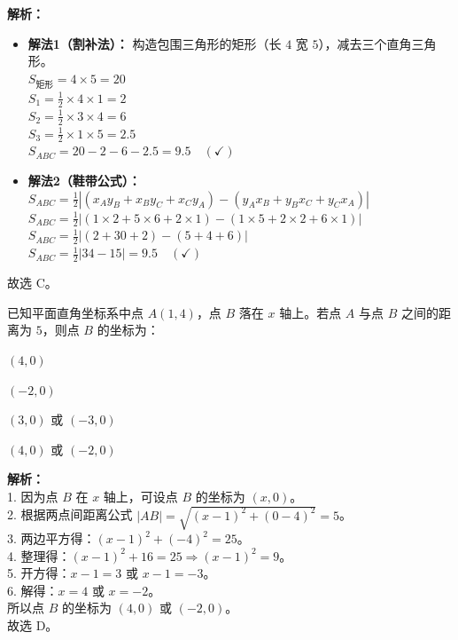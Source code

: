 \begin{solution}
    \textbf{解析：}
    \begin{itemize}
        \item \textbf{解法1（割补法）：} 构造包围三角形的矩形（长 $4$ 宽 $5$），减去三个直角三角形。\\
        $S_{\text{矩形}} = 4 \times 5 = 20$ \\
        $S_1 = \frac{1}{2} \times 4 \times 1 = 2$ \\
        $S_2 = \frac{1}{2} \times 3 \times 4 = 6$ \\
        $S_3 = \frac{1}{2} \times 1 \times 5 = 2.5$ \\
        $S_{ABC} = 20 - 2 - 6 - 2.5 = 9.5 \quad (\checkmark)$
        
        \item \textbf{解法2（鞋带公式）：} \\
        $S_{ABC} = \frac{1}{2} |(x_A y_B + x_B y_C + x_C y_A) - (y_A x_B + y_B x_C + y_C x_A)|$ \\
        $S_{ABC} = \frac{1}{2} |(1 \times 2 + 5 \times 6 + 2 \times 1) - (1 \times 5 + 2 \times 2 + 6 \times 1)|$ \\
        $S_{ABC} = \frac{1}{2} |(2 + 30 + 2) - (5 + 4 + 6)|$ \\
        $S_{ABC} = \frac{1}{2} |34 - 15| = 9.5 \quad (\checkmark)$
    \end{itemize}
    故选 C。
\end{solution}

\begin{question}
    已知平面直角坐标系中点 $A(1, 4)$，点 $B$ 落在 $x$ 轴上。若点 $A$ 与点 $B$ 之间的距离为 $5$，则点 $B$ 的坐标为： \paren[D]
    \begin{choices}
        \item $(4, 0)$ \item $(-2, 0)$ \item $(3, 0)$ 或 $(-3, 0)$ \item $(4, 0)$ 或 $(-2, 0)$
    \end{choices}
\end{question}

\begin{solution}
    \textbf{解析：} \\
    1. 因为点 $B$ 在 $x$ 轴上，可设点 $B$ 的坐标为 $(x, 0)$。 \\
    2. 根据两点间距离公式 $|AB| = \sqrt{(x - 1)^2 + (0 - 4)^2} = 5$。 \\
    3. 两边平方得：$(x - 1)^2 + (-4)^2 = 25$。 \\
    4. 整理得：$(x - 1)^2 + 16 = 25 \Rightarrow (x - 1)^2 = 9$。 \\
    5. 开方得：$x - 1 = 3$ 或 $x - 1 = -3$。 \\
    6. 解得：$x = 4$ 或 $x = -2$。 \\
    所以点 $B$ 的坐标为 $(4, 0)$ 或 $(-2, 0)$。 \\
    故选 D。
\end{solution}



